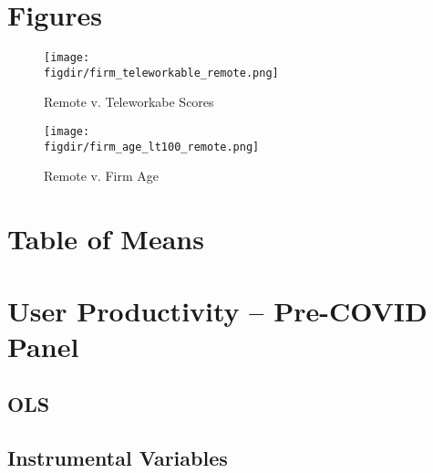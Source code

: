 \documentclass{article}
\newcommand{\cleanedresultsdir}{../results/cleaned}
\newcommand{\figdir}{../results/figures}
\begin{document}


\section{Figures}

\begin{figure}[H]
  \centering
  \texttt{[image: \\figdir/firm\_teleworkable\_remote.png]}
  \caption{Remote v. Teleworkabe Scores}
\end{figure}

\begin{figure}[H]
  \centering
  \texttt{[image: \\figdir/firm\_age\_lt100\_remote.png]}
  \caption{Remote v. Firm Age}
\end{figure}


\section{Table of Means}
%
\section{User Productivity – Pre-COVID Panel}

\subsection{OLS}


\subsection{Instrumental Variables}

\end{document}
